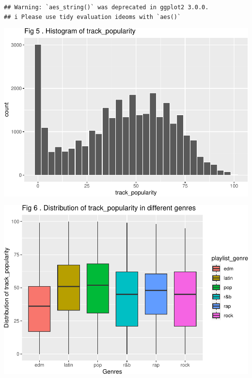 \documentclass[
]{article}
\begin{document}
\begin{verbatim}
## Warning: `aes_string()` was deprecated in ggplot2 3.0.0.
## i Please use tidy evaluation ideoms with `aes()`
\end{verbatim}

\includegraphics{Final-Report_files/figure-latex/unnamed-chunk-14-1.pdf}

\includegraphics{Final-Report_files/figure-latex/unnamed-chunk-14-2.pdf}
\end{document}
